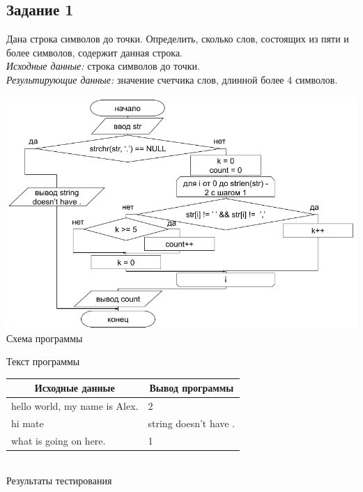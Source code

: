 \documentclass[a4paper,14pt]{extarticle}
\begin{document}
\subsection{Задание 1}
Дана строка символов до точки. Определить, сколько слов, состоящих из пяти и более символов, содержит данная строка.\\
\textit{Исходные данные:} строка символов до точки.\\
\textit{Результирующие данные:} значение счетчика слов, длинной более 4 символов.\\
\begin{center}
\includegraphics[scale=0.6]{lab6-1.png}\\
Схема программы
\end{center}

\begin{center}
Текст программы\\
\vspace{0.6cm}
\begin{tabular}{|l|l|}
\hline
\multicolumn{1}{|c|}{Исходные данные}& \multicolumn{1}{|c|}{Вывод программы}\\
\hline
hello world, my name is Alex. & 2 \\
\hline
hi mate & string doesn't have . \\
\hline
what is going on here. & 1 \\
\hline
\end{tabular}\\
\vspace{0.3cm}
Результаты тестирования
\end{center}
\end{document}
